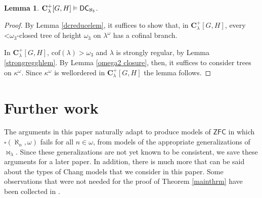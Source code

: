 \documentclass[12pt]{article}
\newtheorem{lemma}[theorem]{Lemma}
\def\bbC{{\mathbf{C}}}
\newcommand{\ZFC}{\mathsf{ZFC}}
\renewcommand{\models}{\vDash}
\newcommand{\less}{\mathord{<}}
\newcommand{\cof}{\mathrm{cof}}
\begin{document}
\begin{lemma}\label{dcomega_3lem} $\bbC^+_{\lambda}[G, H]\models \sf{DC}_{\aleph_3}$.
\end{lemma}



\begin{proof}
By Lemma \ref{dcreducelem}, it suffices to show that, in $\bbC^{+}_{\lambda}[G, H]$, every $\less\omega_{3}$-closed tree of height $\omega_{3}$ on $\lambda^{\omega}$ has a cofinal branch.

In $\bbC^{+}_{\lambda}[G,H]$, $\cof(\lambda) > \omega_{3}$ and $\lambda$ is strongly regular, by Lemma \ref{strongregghlem}.
By Lemma \ref{omega2 closure}, then, it suffices to consider trees on $\kappa^{\omega}$.
Since $\kappa^{\omega}$ is wellordered in $\bbC^{+}_{\lambda}[G, H]$ the lemma follows.
\end{proof}

\section{Further work}

The arguments in this paper naturally adapt to produce models of $\ZFC$ in which $\square(\aleph_{n}, \omega)$ fails for all $n \in \omega$, from models of the appropriate generalizations of $\Join_{\lambda}$. Since these generalizations are not yet known to be consistent, we save these arguments for a later paper. In addition, there is much more that can be said about the types of Chang models that we consider in this paper. Some observations that were not needed for the proof of Theorem \ref{mainthrm} have been collected in \cite{LSmoreChang}.



\end{document}

